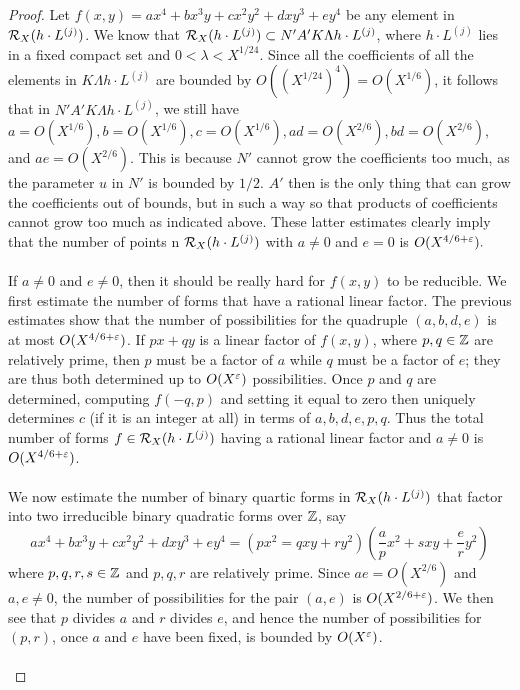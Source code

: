 \documentclass[12pt,amsfont]{amsart}
\begin{document}
\begin{proof} Let $f(x,y) = ax^4 + bx^3 y + cx^2 y^2 + dxy^3 + ey^4$ be any element in $\mathcal{R}_X(h \cdot L^{(j)})$. We know that $\mathcal{R}_X(h \cdot L^{(j)}) \subset N' A' K \Lambda h \cdot L^{(j)}$, where $h \cdot L^{(j)}$ lies in a fixed compact set and $0 < \lambda < X^{1/24}$. Since all the coefficients of all the elements in $K \Lambda h \cdot L^{(j)}$ are bounded by $O((X^{1/24})^4) = O(X^{1/6})$, it follows that in $N'A'K \Lambda h \cdot L^{(j)}$, we still have $a = O(X^{1/6}), b = O(X^{1/6}), c = O(X^{1/6}), ad = O(X^{2/6}), bd = O(X^{2/6}),$ and $ae = O(X^{2/6})$. This is because $N'$ cannot grow the coefficients too much, as the parameter $u$ in $N'$ is bounded by $1/2$. $A'$ then is the only thing that can grow the coefficients out of bounds, but in such a way so that products of coefficients cannot grow too much as indicated above. These latter estimates clearly imply that the number of points n $\mathcal{R}_X(h \cdot L^{(j)})$ with $a \ne 0$ and $e = 0$ is $O(X^{4/6 + \varepsilon}).$ \\ \\
If $a \ne 0$ and $e \ne 0$, then it should be really hard for $f(x,y)$ to be reducible. We first estimate the number of forms that have a rational linear factor. The previous estimates show that the number of possibilities for the quadruple $(a,b,d,e)$ is at most $O(X^{4/6 + \varepsilon})$. If $px + qy$ is a linear factor of $f(x,y)$, where $p,q \in {\mathbb Z}$ are relatively prime, then $p$ must be a factor of $a$ while $q$ must be a factor of $e$; they are thus both determined up to $O(X^\varepsilon)$ possibilities. Once $p$ and $q$ are determined, computing $f(-q,p)$ and setting it equal to zero then uniquely determines $c$ (if it is an integer at all) in terms of $a,b,d,e,p,q$. Thus the total number of forms $f \in \mathcal{R}_X(h \cdot L^{(j)})$ having a rational linear factor and $a \ne 0$ is $O(X^{4/6 + \varepsilon})$. \\ \\
We now estimate the number of binary quartic forms in $\mathcal{R}_X(h \cdot L^{(j)})$ that factor into two irreducible binary quadratic forms over ${\mathbb Z}$, say
\[ax^4 + bx^3 y + cx^2 y^2 + dxy^3 + ey^4 = (px^2 = qxy + ry^2)\left(\frac{a}{p} x^2 + s xy + \frac{e}{r} y^2\right)\]
where $p,q,r,s \in {\mathbb Z}$ and $p,q,r$ are relatively prime. Since $ae = O(X^{2/6})$ and $a,e \ne 0$, the number of possibilities for the pair $(a,e)$ is $O(X^{2/6 + \varepsilon})$. We then see that $p$ divides $a$ and $r$ divides $e$, and hence the number of possibilities for $(p,r)$, once $a$ and $e$ have been fixed, is bounded by $O(X^\varepsilon)$. \\ \\

\end{proof}
\end{document}
